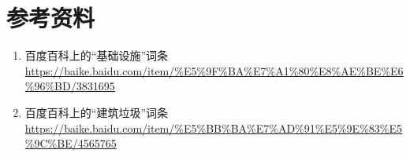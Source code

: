 \documentclass[UTF8]{ctexart}
\begin{document}
\section{参考资料}

\begin{enumerate}
\item 百度百科上的“基础设施”词条  \url{https://baike.baidu.com/item/%E5%9F%BA%E7%A1%80%E8%AE%BE%E6%96%BD/3831695}
\item 百度百科上的“建筑垃圾”词条  \url{https://baike.baidu.com/item/%E5%BB%BA%E7%AD%91%E5%9E%83%E5%9C%BE/4565765}
\end{enumerate}
\end{document}
